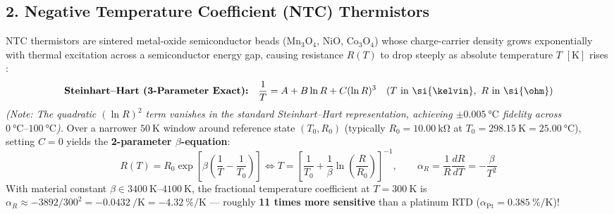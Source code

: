 \subsection{2. Negative Temperature Coefficient (NTC) Thermistors}
NTC thermistors are sintered metal-oxide semiconductor beads ($\mathrm{Mn_3O_4}$, $\mathrm{NiO}$, $\mathrm{Co_3O_4}$) whose charge-carrier density grows exponentially with thermal excitation across a semiconductor energy gap, causing resistance $R(T)$ to drop steeply as absolute temperature $T$ $[\si{\kelvin}]$ rises :
\begin{equation}\label{eq:17:steinhart}
  \text{\textbf{Steinhart--Hart (3-Parameter Exact):}}\quad \frac{1}{T} = A + B\ln R + C(\ln R)^3 \quad (T\text{ in }\si{\kelvin},\ R\text{ in }\si{\ohm})
\end{equation}
\emph{(Note: The quadratic $(\ln R)^2$ term vanishes in the standard Steinhart--Hart representation, achieving $\pm\SI{0.005}{\celsius}$ fidelity across $\SIrange{0}{100}{\celsius}$).} Over a narrower $\SI{50}{\kelvin}$ window around reference state $(T_0, R_0)$ (typically $R_0 = \SI{10.00}{\kilo\ohm}$ at $T_0 = \SI{298.15}{\kelvin} = \SI{25.00}{\celsius}$), setting $C=0$ yields the \textbf{2-parameter $\beta$-equation}:
\begin{equation}\label{eq:17:beta}
  R(T) = R_0\exp\!\left[\beta\!\left(\frac{1}{T} - \frac{1}{T_0}\right)\right] \Longleftrightarrow T = \left[\frac{1}{T_0} + \frac{1}{\beta}\ln\!\left(\frac{R}{R_0}\right)\right]^{-1}, \qquad \alpha_R = \frac{1}{R}\frac{dR}{dT} = -\frac{\beta}{T^2}
\end{equation}
With material constant $\beta \in \SIrange{3400}{4100}{\kelvin}$, the fractional temperature coefficient at $T = \SI{300}{\kelvin}$ is $\alpha_R \approx -3892/300^2 = \SI{-0.0432}{\per\kelvin} = \SI{-4.32}{\percent\per\kelvin}$ --- roughly \textbf{11 times more sensitive} than a platinum RTD ($\alpha_{\mathrm{Pt}} = \SI{+0.385}{\percent\per\kelvin}$)!
